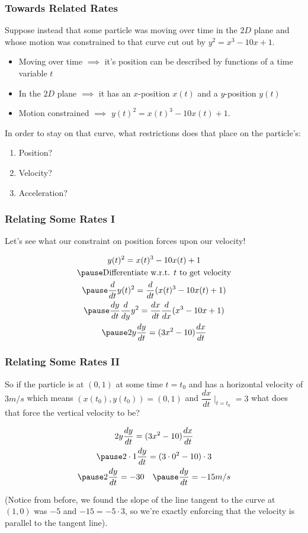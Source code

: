 \documentclass{ltx-talk}
\begin{document}
\begin{frame}
  \frametitle{Towards Related Rates}

  Suppose instead that some particle was moving over time in the $2D$ plane and whose motion was constrained to 
  that curve cut out by $y^2 = x^3 - 10x + 1$. \pause
  \begin{itemize}
    \item Moving over time $\implies$ it's position can be described by functions of a time variable $t$ \pause
    \item In the $2D$ plane $\implies$ it has an $x$-position $x(t)$ and a $y$-position $y(t)$ \pause
    \item Motion constrained $\implies$ $y(t)^2 = x(t)^3 - 10x(t) + 1$. \pause
  \end{itemize}

  In order to stay on that curve, what restrictions does that place on the particle's: \pause
  \begin{enumerate}
    \item Position? \pause
    \item Velocity? \pause
    \item Acceleration? 
  \end{enumerate}
\end{frame}

\begin{frame}
  \frametitle{Relating Some Rates I}
  Let's see what our constraint on position forces upon our velocity! \pause

  \begin{gather}
    y(t)^2 = x(t)^3 - 10x(t) + 1 \\ \pause
    \text{Differentiate w.r.t. } t \text{ to get velocity} \\ \pause
    \dfrac{d}{dt} y(t)^2 = \dfrac{d}{dt}(x(t)^3 - 10x(t) + 1) \\ \pause
    \dfrac{dy}{dt} \dfrac{d}{dy} y^2 = \dfrac{dx}{dt} \dfrac{d}{dx}(x^3 - 10x + 1) \\ \pause
    2y\dfrac{dy}{dt} = (3x^2 - 10)\dfrac{dx}{dt}
  \end{gather}\pause
\end{frame}
\begin{frame}
  \frametitle{Relating Some Rates II}
  So if the particle is at $(0,1)$ at some time $t = t_0$ and has a horizontal velocity of $3 m/s$ \pause
  which means $(x(t_0),y(t_0)) = (0,1)$ and $\dfrac{dx}{dt}\mid_{t = t_0} = 3$ what does that force the vertical velocity to be? \pause

  \begin{gather}
    2y \dfrac{dy}{dt} = (3x^2-10)\dfrac{dx}{dt} \\ \pause
    2 \cdot 1 \dfrac{dy}{dt} = (3 \cdot 0^2 - 10) \cdot 3 \\ \pause
    2 \dfrac{dy}{dt} = -30 \quad \pause \dfrac{dy}{dt} = -15 m/s
  \end{gather} \pause

  (Notice from before, we found the slope of the line tangent to the curve at $(1,0)$ was $-5$ and $-15 = -5 \cdot 3$,
  so we're exactly enforcing that the velocity is parallel to the tangent line).
\end{frame}
\end{document}
